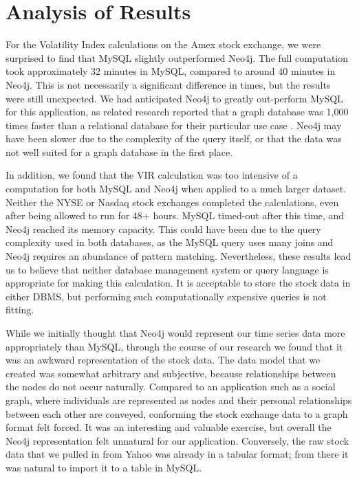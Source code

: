 \documentclass{IEEEtran}
\begin{document}
\section{Analysis of Results}

For the Volatility Index calculations on the Amex stock exchange, we were surprised to find that MySQL slightly outperformed Neo4j. The full computation took approximately 32 minutes in MySQL, compared to around 40 minutes in Neo4j. This is not necessarily a significant difference in times, but the results were still unexpected. We had anticipated Neo4j to greatly out-perform MySQL for this application, as related research reported that a graph database was 1,000 times faster than a relational database for their particular use case \cite{dzone}. Neo4j may have been slower due to the complexity of the query itself, or that the data was not well suited for a graph database in the first place. 

In addition, we found that the VIR calculation was too intensive of a computation for both MySQL and Neo4j when applied to a much larger dataset. Neither the NYSE or Nasdaq stock exchanges completed the calculations, even after being allowed to run for 48+ hours. MySQL timed-out after this time, and Neo4j reached its memory capacity. This could have been due to the query complexity used in both databases, as the MySQL query uses many joins and Neo4j requires an abundance of pattern matching. Nevertheless, these results lead us to believe that neither database management system or query language is appropriate for making this calculation. It is acceptable to store the stock data in either DBMS, but performing such computationally expensive queries is not fitting.  

While we initially thought that Neo4j would represent our time series data more appropriately than MySQL, through the course of our research we found that it was an awkward representation of the stock data. The data model that we created was somewhat arbitrary and subjective, because relationships between the nodes do not occur naturally. Compared to an application such as a social graph, where individuals are represented as nodes and their personal relationships between each other are conveyed, conforming the stock exchange data to a graph format felt forced. It was an interesting and valuable exercise, but overall the Neo4j representation felt unnatural for our application. Conversely, the raw stock data that we pulled in from Yahoo was already in a tabular format; from there it was natural to import it to a table in MySQL.  
\end{document}
